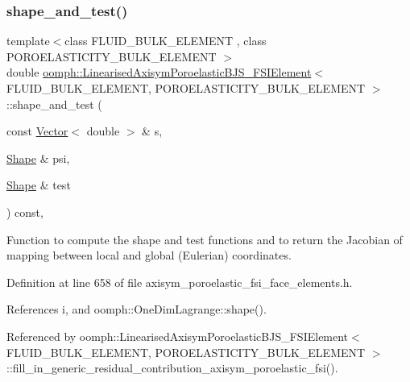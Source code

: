 \subsubsection{\texorpdfstring{shape\+\_\+and\+\_\+test()}{shape\_and\_test()}}
{\footnotesize\ttfamily template$<$class F\+L\+U\+I\+D\+\_\+\+B\+U\+L\+K\+\_\+\+E\+L\+E\+M\+E\+NT , class P\+O\+R\+O\+E\+L\+A\+S\+T\+I\+C\+I\+T\+Y\+\_\+\+B\+U\+L\+K\+\_\+\+E\+L\+E\+M\+E\+NT $>$ \\
double \hyperlink{classoomph_1_1LinearisedAxisymPoroelasticBJS__FSIElement}{oomph\+::\+Linearised\+Axisym\+Poroelastic\+B\+J\+S\+\_\+\+F\+S\+I\+Element}$<$ F\+L\+U\+I\+D\+\_\+\+B\+U\+L\+K\+\_\+\+E\+L\+E\+M\+E\+NT, P\+O\+R\+O\+E\+L\+A\+S\+T\+I\+C\+I\+T\+Y\+\_\+\+B\+U\+L\+K\+\_\+\+E\+L\+E\+M\+E\+NT $>$\+::shape\+\_\+and\+\_\+test (\begin{DoxyParamCaption}\item[{const \hyperlink{classoomph_1_1Vector}{Vector}$<$ double $>$ \&}]{s,  }\item[{\hyperlink{classoomph_1_1Shape}{Shape} \&}]{psi,  }\item[{\hyperlink{classoomph_1_1Shape}{Shape} \&}]{test }\end{DoxyParamCaption}) const\hspace{0.3cm}{\ttfamily [inline]}, {\ttfamily [protected]}}



Function to compute the shape and test functions and to return the Jacobian of mapping between local and global (Eulerian) coordinates. 



Definition at line 658 of file axisym\+\_\+poroelastic\+\_\+fsi\+\_\+face\+\_\+elements.\+h.



References i, and oomph\+::\+One\+Dim\+Lagrange\+::shape().



Referenced by oomph\+::\+Linearised\+Axisym\+Poroelastic\+B\+J\+S\+\_\+\+F\+S\+I\+Element$<$ F\+L\+U\+I\+D\+\_\+\+B\+U\+L\+K\+\_\+\+E\+L\+E\+M\+E\+N\+T, P\+O\+R\+O\+E\+L\+A\+S\+T\+I\+C\+I\+T\+Y\+\_\+\+B\+U\+L\+K\+\_\+\+E\+L\+E\+M\+E\+N\+T $>$\+::fill\+\_\+in\+\_\+generic\+\_\+residual\+\_\+contribution\+\_\+axisym\+\_\+poroelastic\+\_\+fsi().

\mbox{\label{classoomph_1_1LinearisedAxisymPoroelasticBJS__FSIElement_a9d3bcc9afdc79f09987164694d933b75}} 
